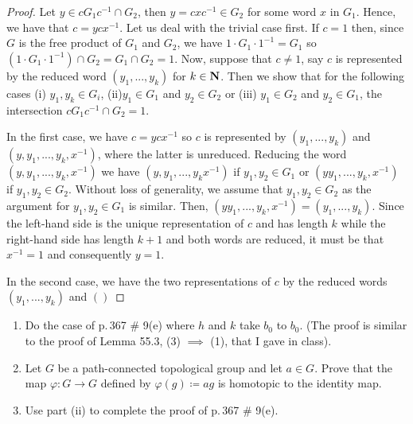\begin{proof}
Let $y\in cG_1c^{-1}\cap G_2$, then $y=cxc^{-1}\in G_2$ for some word $x$
in $G_1$. Hence, we have that $c=ycx^{-1}$. Let us deal with the trivial
case first. If $c=1$ then, since $G$ is the free product of $G_1$ and
$G_2$, we have $1\cdot G_1\cdot 1^{-1}=G_1$ so $(1\cdot G_1\cdot
1^{-1})\cap G_2=G_1\cap G_2=1$. Now, suppose that $c\neq 1$, say $c$ is
represented by the reduced word $(y_1,...,y_k)$ for $k\in\mathbf{N}$. Then we show
that for the following cases (i) $y_1,y_k\in G_i$, (ii)$y_1\in G_1$ and
$y_2\in G_2$ or (iii) $y_1\in G_2$ and $y_2\in G_1$, the intersection
$cG_1c^{-1}\cap G_2=1$.

In the first case, we have $c=ycx^{-1}$ so $c$ is represented by
$(y_1,...,y_k)$ and $(y,y_1,...,y_k,x^{-1})$, where the latter is
unreduced. Reducing the word $(y,y_1,...,y_k,x^{-1})$ we have
$(y,y_1,...,y_kx^{-1})$ if $y_1,y_2\in G_1$ or $(yy_1,...,y_k,x^{-1})$ if
$y_1,y_2\in G_2$. Without loss of generality, we assume that $y_1,y_2\in
G_2$ as the argument for $y_1,y_2\in G_1$ is similar. Then,
$(yy_1,...,y_k,x^{-1})=(y_1,...,y_k)$. Since the left-hand side is the
unique representation of $c$ and has length $k$ while the right-hand side
has length $k+1$ and both words are reduced, it must be that $x^{-1}=1$ and
consequently $y=1$.

In the second case, we have the two representations of $c$ by the reduced
words $(y_1,...,y_k)$ and $()$
\end{proof}
\newpage
\begin{problem}[A]
\begin{enumerate}[label=(\roman*)]
\item Do the case of p.\,367 \# 9(e) where $h$ and $k$ take $b_0$ to
  $b_0$. (The proof is similar to the proof of Lemma 55.3, (3) $\implies$
  (1), that I gave in class).
\item Let $G$ be a path-connected topological group and let $a\in G$. Prove
  that the map $\varphi\colon G\to G$ defined by $\varphi(g)\coloneqq ag$
  is homotopic to the identity map.
\item Use part (ii) to complete the proof of p.\,367 \# 9(e).
\end{enumerate}
\end{problem}
